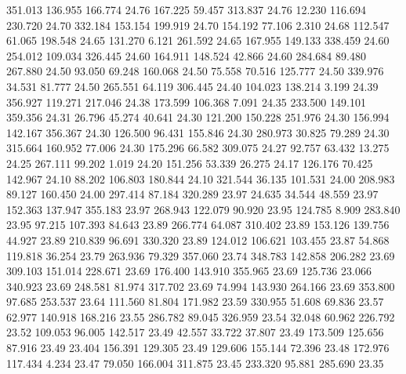  351.013  136.955  166.774        24.76
 167.225   59.457  313.837        24.76
  12.230  116.694  230.720        24.70
 332.184  153.154  199.919        24.70
 154.192   77.106    2.310        24.68
 112.547   61.065  198.548        24.65
 131.270    6.121  261.592        24.65
 167.955  149.133  338.459        24.60
 254.012  109.034  326.445        24.60
 164.911  148.524   42.866        24.60
 284.684   89.480  267.880        24.50
  93.050   69.248  160.068        24.50
  75.558   70.516  125.777        24.50
 339.976   34.531   81.777        24.50
 265.551   64.119  306.445        24.40
 104.023  138.214    3.199        24.39
 356.927  119.271  217.046        24.38
 173.599  106.368    7.091        24.35
 233.500  149.101  359.356        24.31
  26.796   45.274   40.641        24.30
 121.200  150.228  251.976        24.30
 156.994  142.167  356.367        24.30
 126.500   96.431  155.846        24.30
 280.973   30.825   79.289        24.30
 315.664  160.952   77.006        24.30
 175.296   66.582  309.075        24.27
  92.757   63.432   13.275        24.25
 267.111   99.202    1.019        24.20
 151.256   53.339   26.275        24.17
 126.176   70.425  142.967        24.10
  88.202  106.803  180.844        24.10
 321.544   36.135  101.531        24.00
 208.983   89.127  160.450        24.00
 297.414   87.184  320.289        23.97
  24.635   34.544   48.559        23.97
 152.363  137.947  355.183        23.97
 268.943  122.079   90.920        23.95
 124.785    8.909  283.840        23.95
  97.215  107.393   84.643        23.89
 266.774   64.087  310.402        23.89
 153.126  139.756   44.927        23.89
 210.839   96.691  330.320        23.89
 124.012  106.621  103.455        23.87
  54.868  119.818   36.254        23.79
 263.936   79.329  357.060        23.74
 348.783  142.858  206.282        23.69
 309.103  151.014  228.671        23.69
 176.400  143.910  355.965        23.69
 125.736   23.066  340.923        23.69
 248.581   81.974  317.702        23.69
  74.994  143.930  264.166        23.69
 353.800   97.685  253.537        23.64
 111.560   81.804  171.982        23.59
 330.955   51.608   69.836        23.57
  62.977  140.918  168.216        23.55
 286.782   89.045  326.959        23.54
  32.048   60.962  226.792        23.52
 109.053   96.005  142.517        23.49
  42.557   33.722   37.807        23.49
 173.509  125.656   87.916        23.49
  23.404  156.391  129.305        23.49
 129.606  155.144   72.396        23.48
 172.976  117.434    4.234        23.47
  79.050  166.004  311.875        23.45
 233.320   95.881  285.690        23.35
